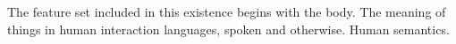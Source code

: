 

The feature set included in this existence begins with the body.  The
meaning of things in human interaction languages, spoken and
otherwise.  Human semantics.

\bye
